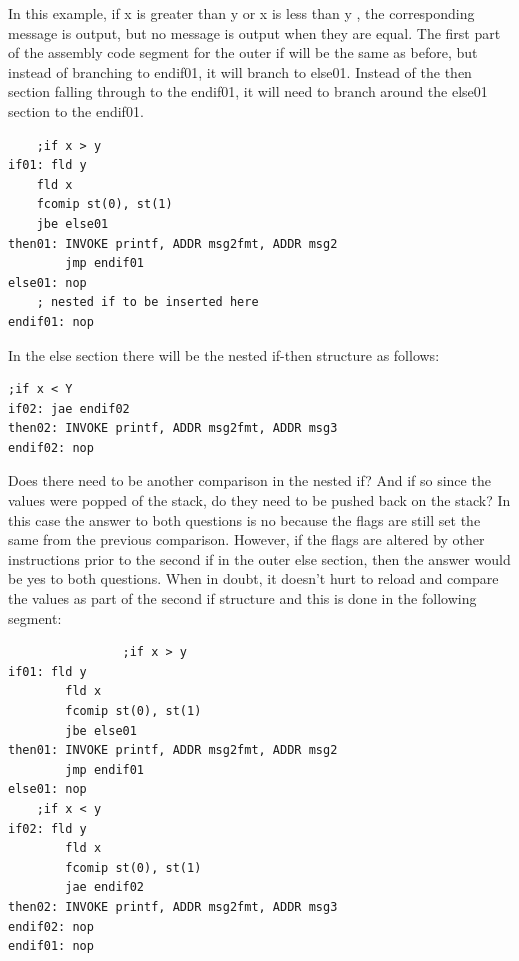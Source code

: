 \documentclass[10pt]{article}
\begin{document}
In this example, if x is greater than y or x is less than y , the corresponding message is output, but no message is output when they are equal. The first part of the assembly code segment for the outer if will be the same as before, but instead of branching to endif01, it will branch to else01. Instead of the then section falling through to the endif01, it will need to branch around the else01 section to the endif01.

\begin{verbatim}
    ;if x > y
if01: fld y
    fld x
    fcomip st(0), st(1)
    jbe else01
then01: INVOKE printf, ADDR msg2fmt, ADDR msg2
        jmp endif01
else01: nop
    ; nested if to be inserted here
endif01: nop
\end{verbatim}

In the else section there will be the nested if-then structure as follows:

\begin{verbatim}
;if x < Y
if02: jae endif02
then02: INVOKE printf, ADDR msg2fmt, ADDR msg3
endif02: nop
\end{verbatim}

Does there need to be another comparison in the nested if? And if so since the values were popped of the stack, do they need to be pushed back on the stack? In this case the answer to both questions is no because the flags are still set the same from the previous comparison. However, if the flags are altered by other instructions prior to the second if in the outer else section, then the answer would be yes to both questions. When in doubt, it doesn't hurt to reload and compare the values as part of the second if structure and this is done in the following segment:

\begin{verbatim}
                ;if x > y
if01: fld y
        fld x
        fcomip st(0), st(1)
        jbe else01
then01: INVOKE printf, ADDR msg2fmt, ADDR msg2
        jmp endif01
else01: nop
    ;if x < y
if02: fld y
        fld x
        fcomip st(0), st(1)
        jae endif02
then02: INVOKE printf, ADDR msg2fmt, ADDR msg3
endif02: nop
endif01: nop
\end{verbatim}
\end{document}
